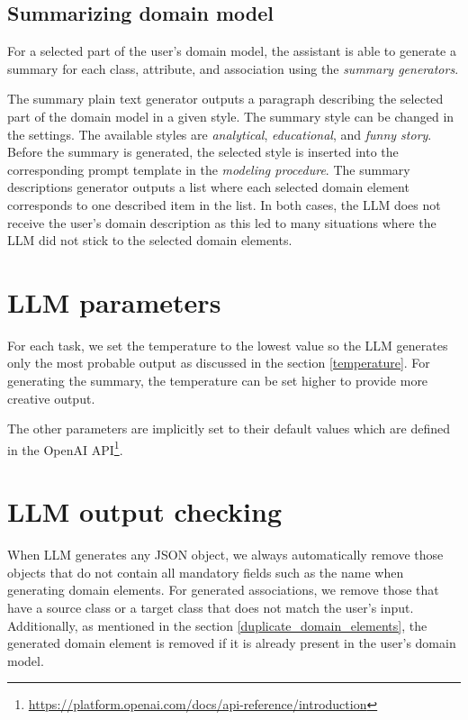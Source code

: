 \subsection{Summarizing domain model}
\label{sec:summarising_domain_model}

For a selected part of the user's domain model, the assistant is able to generate a summary for each class, attribute, and association using the \emph{summary generators}.

The summary plain text generator outputs a paragraph describing the selected part of the domain model in a given style. The summary style can be changed in the settings. The available styles are \textit{analytical}, \textit{educational}, and \textit{funny story}. Before the summary is generated, the selected style is inserted into the corresponding prompt template in the \emph{modeling procedure}. The summary descriptions generator outputs a list where each selected domain element corresponds to one described item in the list. In both cases, the LLM does not receive the user's domain description as this led to many situations where the LLM did not stick to the selected domain elements.


\section{LLM parameters}

For each task, we set the temperature to the lowest value so the LLM generates only the most probable output as discussed in the section \ref{temperature}. For generating the summary, the temperature can be set higher to provide more creative output.

The other parameters are implicitly set to their default values which are defined in the OpenAI API\footnote{\url{https://platform.openai.com/docs/api-reference/introduction}}.


\section{LLM output checking}

When LLM generates any JSON object, we always automatically remove those objects that do not contain all mandatory fields such as the name when generating domain elements. For generated associations, we remove those that have a source class or a target class that does not match the user's input. Additionally, as mentioned in the section \ref{duplicate_domain_elements}, the generated domain element is removed if it is already present in the user's domain model.

